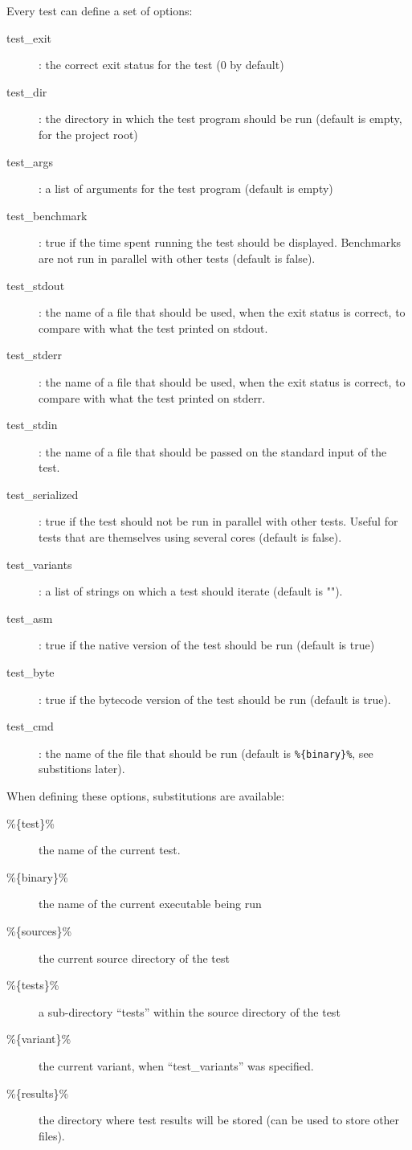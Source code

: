 Every test can define a set of options:
\begin{description}
\item[test\_exit]: the correct exit status for the test (0 by default) 
\item[test\_dir]: the directory in which the test program should be run
  (default is empty, for the project root)
\item[test\_args]: a list of arguments for the test program (default is empty)
\item[test\_benchmark]: true if the time spent running the test should
  be displayed. Benchmarks are not run in parallel with other tests
  (default is false).
\item[test\_stdout]: the name of a file that should be used, when the
  exit status is correct, to compare with what the test printed on
  stdout.
\item[test\_stderr]: the name of a file that should be used, when the
  exit status is correct, to compare with what the test printed on
  stderr.
\item[test\_stdin]: the name of a file that should be passed on
  the standard input of the test.
\item[test\_serialized]: true if the test should not be run in
  parallel with other tests. Useful for tests that are themselves
  using several cores (default is false).
\item[test\_variants]: a list of strings on which a test should
  iterate (default is "").
\item[test\_asm]: true if the native version of the test should be run
 (default is true)
\item[test\_byte]: true if the bytecode version of the test should be run
  (default is true).
\item[test\_cmd]: the name of the file that should be run (default is
\verb-%{binary}%-, see substitions later).
\end{description}

When defining these options, substitutions are available:
\begin{description}
\item[\%\{test\}\%] the name of the current test.
\item[\%\{binary\}\%] the name of the current executable being run
\item[\%\{sources\}\%] the current source directory of the test
\item[\%\{tests\}\%] a sub-directory ``tests'' within the source
  directory of the test
\item[\%\{variant\}\%] the current variant, when ``test\_variants''
  was specified.
\item[\%\{results\}\%] the directory where test results will be stored
  (can be used to store other files).
\end{description}

